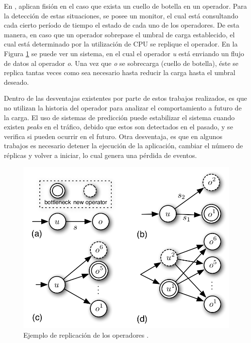 En \citep{FernandezMKP13}, aplican fisión en el caso que exista un cuello de botella en un operador. Para la detección de estas situaciones, se posee un monitor, el cual está consultando cada cierto período de tiempo el estado de cada uno de los operadores. De esta manera, en caso que un operador sobrepase el umbral de carga establecido, el cual está determinado por la utilización de CPU se replique el operador. En la Figura \ref{fig:ejFision} se puede ver un sistema, en el cual el operador \textit{u} está enviando un flujo de datos al operador \textit{o}. Una vez que \textit{o} se sobrecarga (cuello de botella),\normalsize{ éste se replica tantas veces como sea necesario hasta reducir la carga hasta el umbral deseado.}

Dentro de las desventajas existentes por parte de estos trabajos realizados, es que no utilizan la historia del operador para analizar el comportamiento a futuro de la carga. El uso de sistemas de predicción puede estabilizar el sistema cuando existen \textit{peaks} en el tráfico, debido que estos son detectados en el pasado, y se verifica si pueden ocurrir en el futuro. \normalsize{Otra} desventaja, es que en algunos trabajos es necesario detener la ejecución de la aplicación, cambiar el número de réplicas y volver a iniciar, lo cual genera una pérdida de eventos.

\begin{figure}[!ht]
	\centering
	\includegraphics[scale=0.3]{images/EjFision.png}
	\caption{Ejemplo de replicación de los operadores \citep{FernandezMKP13}.}
	\label{fig:ejFision}
\end{figure}